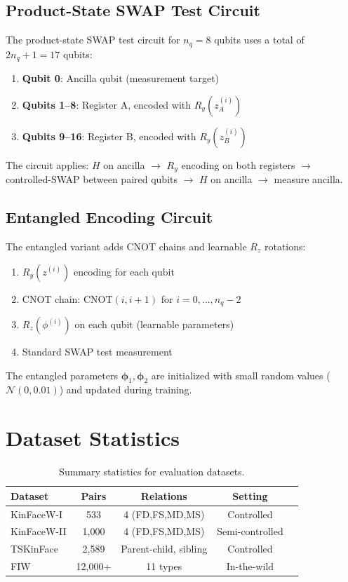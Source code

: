 \documentclass[journal,12pt]{IEEEtran}
\begin{document}
\subsection{Product-State SWAP Test Circuit}
The product-state SWAP test circuit for $n_q = 8$ qubits uses a total
of $2n_q + 1 = 17$ qubits:
\begin{enumerate}
    \item \textbf{Qubit 0}: Ancilla qubit (measurement target)
    \item \textbf{Qubits 1--8}: Register A, encoded with $R_y(z_A^{(i)})$
    \item \textbf{Qubits 9--16}: Register B, encoded with $R_y(z_B^{(i)})$
\end{enumerate}

The circuit applies: $H$ on ancilla $\to$ $R_y$ encoding on both
registers $\to$ controlled-SWAP between paired qubits $\to$ $H$ on
ancilla $\to$ measure ancilla.

\subsection{Entangled Encoding Circuit}
The entangled variant adds CNOT chains and learnable $R_z$ rotations:
\begin{enumerate}
    \item $R_y(z^{(i)})$ encoding for each qubit
    \item CNOT chain: $\text{CNOT}(i, i+1)$ for $i = 0, \ldots, n_q-2$
    \item $R_z(\phi^{(i)})$ on each qubit (learnable parameters)
    \item Standard SWAP test measurement
\end{enumerate}

The entangled parameters $\bm{\phi}_1, \bm{\phi}_2$ are initialized with
small random values ($\mathcal{N}(0, 0.01)$) and updated during training.

\section{Dataset Statistics}
\label{sec:dataset_stats}

\begin{table}[H]
    \centering
    \caption{Summary statistics for evaluation datasets.}
    \label{tab:dataset_stats}
    \begin{tabular}{lcccc}
        \toprule
        \textbf{Dataset} & \textbf{Pairs} & \textbf{Relations} & \textbf{Setting} \\
        \midrule
        KinFaceW-I  & 533   & 4 (FD,FS,MD,MS) & Controlled \\
        KinFaceW-II & 1,000 & 4 (FD,FS,MD,MS) & Semi-controlled \\
        TSKinFace   & 2,589 & Parent-child, sibling & Controlled \\
        FIW         & 12,000+ & 11 types & In-the-wild \\
        \bottomrule
    \end{tabular}
\end{table}
\end{document}
